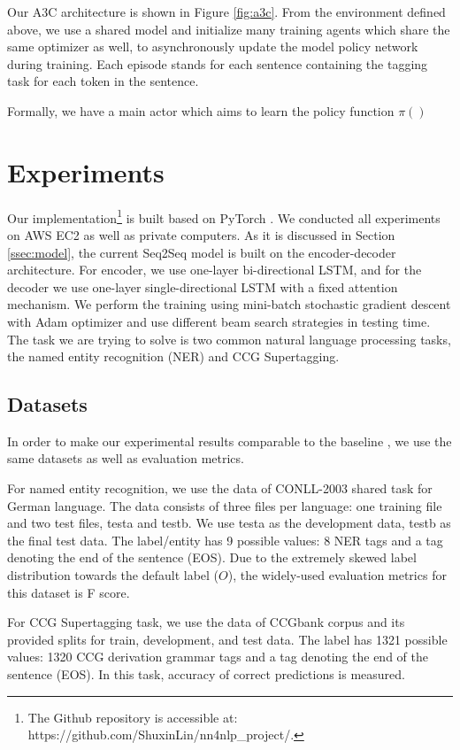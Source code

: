 \documentclass[11pt,a4paper]{article}
\begin{document}
Our A3C architecture is shown in Figure \ref{fig:a3c}. From the environment defined above, we use a shared model and initialize many training agents which share the same optimizer as well, to asynchronously update the model policy network during training. Each episode stands for each sentence containing the tagging task for each token in the sentence. 

Formally, we have a main actor which aims to learn the policy function $\pi()$

\section{Experiments}

Our implementation\footnote{The Github repository is accessible at: https://github.com/ShuxinLin/nn4nlp\_project/.} is built based on PyTorch \cite{paszke2017automatic}. We conducted all experiments on AWS EC2 as well as private computers. As it is discussed in Section \ref{ssec:model}, the current Seq2Seq model is built on the encoder-decoder architecture. For encoder, we use one-layer bi-directional LSTM, and for the decoder we use one-layer single-directional LSTM with a fixed attention mechanism. We perform the training using mini-batch stochastic gradient descent with Adam optimizer and use different beam search strategies in testing time. The task we are trying to solve is two common natural language processing tasks, the named entity recognition (NER) and CCG Supertagging.

\subsection{Datasets}
In order to make our experimental results comparable to the baseline \cite{goyal2017continuous}, we use the same datasets as well as evaluation metrics. 

For named entity recognition, we use the data of CONLL-2003 shared task \cite{tjongkimsang2003conll} for German language. The data consists of three files per language: one training file and two test files, testa and testb. We use testa as the development data, testb as the final test data.  The label/entity has 9 possible values: 8 NER tags and a tag denoting the end of the sentence (EOS). Due to the extremely skewed label distribution towards the default label ($O$), the widely-used evaluation metrics for this dataset is F score.

 For CCG Supertagging task, we use the data of CCGbank corpus \cite{hockenmaier2007ccgbank} and its provided splits for train, development, and test data. The label has 1321 possible values: 1320 CCG derivation grammar tags and a tag denoting the end of the sentence (EOS). In this task, accuracy of correct predictions is measured.
\end{document}
